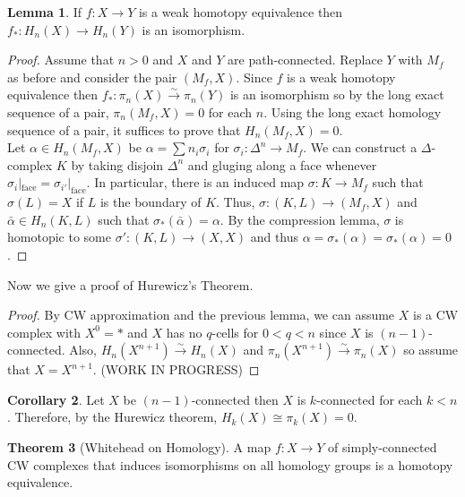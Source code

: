 \documentclass[12pt]{extarticle}
\theoremstyle{definition}
\newtheorem{theorem}{Theorem}[section]
\newtheorem{lemma}[theorem]{Lemma}
\newtheorem{corollary}[theorem]{Corollary}
\begin{document}
\begin{lemma}
If $f : X \to Y$ is a weak homotopy equivalence then $f_* : H_n(X) \to H_n(Y)$ is an isomorphism.
\end{lemma} 

\begin{proof}
Assume that $n > 0$ and $X$ and $Y$ are path-connected. Replace $Y$ with $M_f$ as before and consider the pair $(M_f, X)$. Since $f$ is a weak homotopy equivalence then $f_* : \pi_n(X) \xrightarrow{\sim} \pi_n(Y)$ is an isomorphism so by the long exact sequence of a pair, $\pi_n(M_f, X) = 0$ for each $n$. Using the long exact homology sequence of a pair, it suffices to prove that $H_n(M_f, X) = 0$. \bigskip\\
Let $\alpha \in H_n(M_f, X)$ be $\alpha = \sum n_i \sigma_i$ for $\sigma_i : \Delta^n \to M_f$. We can construct a $\Delta$-complex $K$ by taking disjoin $\Delta^n$ and gluging along a face whenever $\sigma_i |_{\text{face}} = \sigma_{i'} |_{\text{face}}$. In particular, there is an induced map $\sigma : K \to M_f$ such that $\sigma(L) = X$ if $L$ is the boundary of $K$. Thus, $\sigma : (K, L) \to (M_f, X)$ and $\bar{\alpha} \in H_n(K,L)$ such that $\sigma_*(\bar{\alpha}) = \alpha$. By the compression lemma, $\sigma$ is homotopic to some $\sigma' : (K, L) \to (X, X)$ and thus $\alpha = \sigma_*(\alpha) = \sigma_*(\alpha) = 0$.  
\end{proof}

Now we give a proof of Hurewicz's Theorem.

\begin{proof}
By CW approximation and the previous lemma, we can assume $X$ is a CW complex with $X^0 = \ast$ and $X$ has no $q$-cells for $0 < q < n$ since $X$ is $(n-1)$-connected. Also, $H_n(X^{n+1}) \xrightarrow{\sim} H_n(X)$ and $\pi_n(X^{n+1}) \xrightarrow{\sim} \pi_n(X)$ so assume that $X = X^{n+1}$. (WORK IN PROGRESS) 
\end{proof}

\begin{corollary}
Let $X$ be $(n-1)$-connected then $X$ is $k$-connected for each $k < n$. Therefore, by the Hurewicz theorem, $H_k(X) \cong \pi_k(X) = 0$. 
\end{corollary}

\begin{theorem}[Whitehead on Homology]
A map $f : X \to Y$ of simply-connected CW complexes that induces isomorphisms on all homology groups is a homotopy equivalence.  
\end{theorem}
\end{document}
